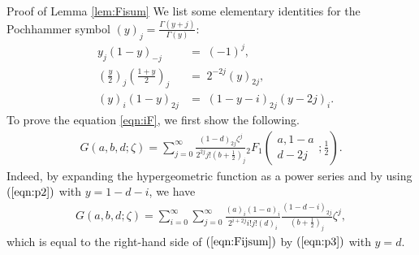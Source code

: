 \documentclass[12pt]{article}
\numberwithin{equation}{section}
\newenvironment{proof*}[1]{\noindent{\textit{#1.\ }}}{\hspace*{\fill}$\Box$\medskip}
\begin{document}
\begin{proof*}{Proof of Lemma \ref{lem:Fisum}}
  We list some elementary identities for the Pochhammer symbol $(y)_j =
  \frac{\Gamma (y + j)}{\Gamma (y)}$:
  \begin{eqnarray}
    & y_j (1 - y)_{- j} & = \; (- 1)^j,  \label{eqn:p1}\\
    & \left( \frac{y}{2} \right)_j \left( \frac{1 + y}{2} \right)_j & = \;
    2^{- 2 j} (y)_{2 j},  \label{eqn:p2}\\
    & (y)_i (1 - y)_{2 j} & = \; (1 - y - i)_{2 j} (y - 2 j)_i . 
    \label{eqn:p3}
  \end{eqnarray}
  To prove the equation \eqref{eqn:iF}, we first show the following.
  \begin{eqnarray}
    & G (a, b, d ; \zeta) = \displaystyle\sum_{j = 0}^{\infty} \frac{(1 - d)_{2 j}
    \zeta^j}{2^{2 j} j! \left( b + \frac{1}{2} \right)_j}{}_2 F_1 \left(
    \begin{array}{c}
      a, 1 - a\\
      d - 2 j
    \end{array} ; \frac{1}{2} \right) . &  \label{eqn:Fijsum}
  \end{eqnarray}
  Indeed, by expanding the hypergeometric function as a power series and by
  using $(\ref{eqn:p2})$ with $y = 1 - d - i$, we have
  \begin{eqnarray}
    & G (a, b, d ; \zeta) = \displaystyle\sum_{i = 0}^{\infty} \displaystyle\sum_{j = 0}^{\infty}
    \frac{(a)_i (1 - a)_i}{2^{i + 2 j} i!j! (d)_i}  \frac{(1 - d - i)_{2
    j}}{\left( b + \frac{1}{2} \right)_j} \zeta^j, &  \nonumber
  \end{eqnarray}
  which is equal to the right-hand side of $(\ref{eqn:Fijsum})$ by
  $(\ref{eqn:p3})$ with $y = d$.
  

\end{proof*}
\end{document}
